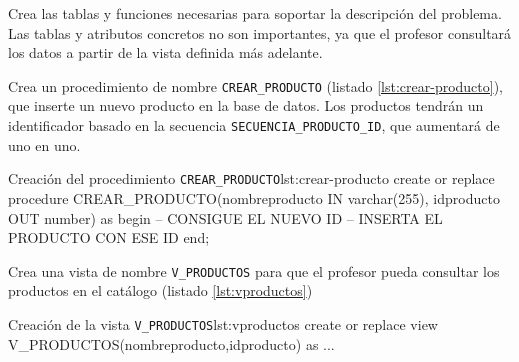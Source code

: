 \begin{homeworkProblem}
  Crea las tablas y funciones necesarias para soportar la descripción del problema. Las tablas y atributos concretos no son importantes, ya que el profesor consultará los datos a partir de la vista definida más adelante.
\end{homeworkProblem}

 \setcounter{Avion}{1}
 \setcounter{SN}{1}
 \setcounter{Asiento}{1}
 \setcounter{Motor}{1}
\newcommand{\Contador}[1]{%
  \arabic{#1}%
  \stepcounter{#1}%
}
\newcommand{\FuselajePN}{PN-001}
\newcommand{\AsientoPN}{PN-002}
\newcommand{\ControlesPN}{PN-003}
\newcommand{\MotorPN}{PN-004}

\begin{homeworkProblem}
  Crea un procedimiento de nombre \texttt{CREAR\_PRODUCTO} (listado \ref{lst:crear-producto}), que inserte un nuevo producto en la base de datos.  Los productos tendrán un identificador basado en la secuencia \texttt{SECUENCIA\_PRODUCTO\_ID}, que aumentará de uno en uno. 

  \begin{listadosql}{Creación del procedimiento \texttt{CREAR\_PRODUCTO}}{lst:crear-producto}
create or replace procedure CREAR_PRODUCTO(nombreproducto IN varchar(255), idproducto OUT number)
as 
begin
  -- CONSIGUE EL NUEVO ID 
  -- INSERTA EL PRODUCTO CON ESE ID
end;
\end{listadosql}

  Crea una vista de nombre \texttt{V\_PRODUCTOS} para que el profesor pueda consultar los productos en el catálogo (listado \ref{lst:vproductos})
  
  \begin{listadosql}{Creación de la vista \texttt{V\_PRODUCTOS}}{lst:vproductos}
  create or replace view V_PRODUCTOS(nombreproducto,idproducto) as
  ...
  \end{listadosql}


  
\end{homeworkProblem}

